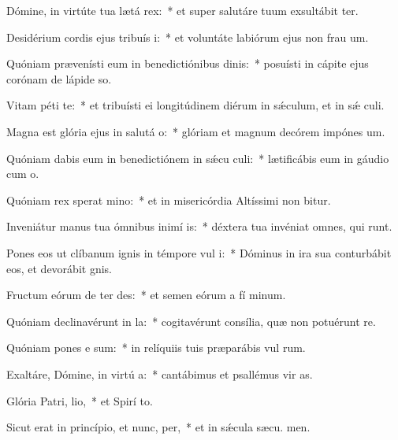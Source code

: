 \item Dómine, in virtúte tua lætá rex:~* et super salutáre tuum exsultábit ter.
\item Desidérium cordis ejus tribuís i:~* et voluntáte labiórum ejus non frau um.
\item Quóniam prævenísti eum in benedictiónibus dinis:~* posuísti in cápite ejus corónam de lápide so.
\item Vitam péti  te:~* et tribuísti ei longitúdinem diérum in sǽculum, et in sǽ culi.
\item Magna est glória ejus in salutá o:~* glóriam et magnum decórem impónes  um.
\item Quóniam dabis eum in benedictiónem in sǽcu culi:~* lætificábis eum in gáudio cum  o.
\item Quóniam rex sperat  mino:~* et in misericórdia Altíssimi non bitur.
\item Inveniátur manus tua ómnibus inimí is:~* déxtera tua invéniat omnes, qui  runt.
\item Pones eos ut clíbanum ignis in témpore vul i:~* Dóminus in ira sua conturbábit eos, et devorábit  gnis.
\item Fructum eórum de ter des:~* et semen eórum a fí minum.
\item Quóniam declinavérunt in  la:~* cogitavérunt consília, quæ non potuérunt re.
\item Quóniam pones e sum:~* in relíquiis tuis præparábis vul rum.
\item Exaltáre, Dómine, in virtú a:~* cantábimus et psallémus vir as.
\item Glória Patri,  lio,~* et Spirí to.
\item Sicut erat in princípio, et nunc,  per,~* et in sǽcula sæcu. men.
